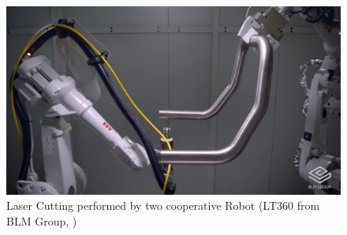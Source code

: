 \documentclass[twocolumn]{svjour3}
\begin{document}
\begin{figure}[t]
	\centering
	\includegraphics[trim={0 0.25cm 0 0.25cm},clip, width=0.8\columnwidth]{maxresdefault.jpg}
	\caption{Laser Cutting performed by two cooperative Robot (LT360 from BLM Group,  \cite{blmlt360})}
	\label{fig:blm}
\end{figure}
\end{document}
